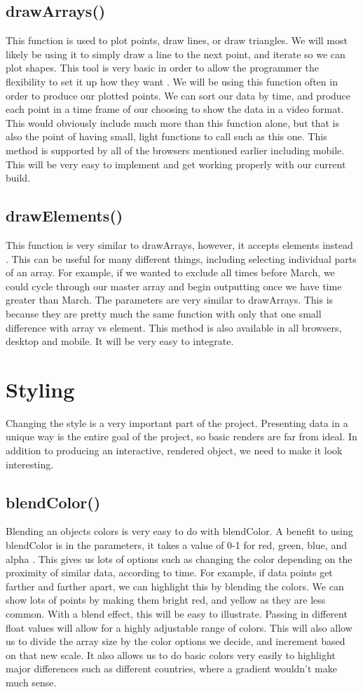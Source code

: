 \documentclass[letterpaper, 10pt] {article}
\begin{document}
\subsection{drawArrays()}
This function is used to plot points, draw lines, or draw triangles. We will most likely be using it to simply draw a line to the next point, and iterate so we can plot shapes. This tool is very basic in order to allow the programmer the flexibility to set it up how they want \cite{drawarrays}. 
We will be using this function often in order to produce our plotted points. We can sort our data by time, and produce each point in a time frame of our choosing to show the data in a video format. This would obviously include much more than this function alone, but that is also the point of having small, light functions to call such as this one.
This method is supported by all of the browsers mentioned earlier including mobile. This will be very easy to implement and get working properly with our current build.
\subsection{drawElements()}
This function is very similar to drawArrays, however, it accepts elements instead \cite{drawelements}. This can be useful for many different things, including selecting individual parts of an array. For example, if we wanted to exclude all times before March, we could cycle through our master array and begin outputting once we have time greater than March. 
The parameters are very similar to drawArrays. This is because they are pretty much the same function with only that one small difference with array vs element.
This method is also available in all browsers, desktop and mobile. It will be very easy to integrate.
\section{Styling}
Changing the style is a very important part of the project. Presenting data in a unique way is the entire goal of the project, so basic renders are far from ideal. In addition to producing an interactive, rendered object, we need to make it look interesting. 
\subsection{blendColor()}
Blending an objects colors is very easy to do with blendColor. A benefit to using blendColor is in the parameters, it takes a value of 0-1 for red, green, blue, and alpha \cite{blendcolor}. This gives us lots of options such as changing the color depending on the proximity of similar data, according to time. For example, if data points get farther and farther apart, we can highlight this by blending the colors. We can show lots of points by making them bright red, and yellow as they are less common. With a blend effect, this will be easy to illustrate. 
Passing in different float values will allow for a highly adjustable range of colors. This will also allow us to divide the array size by the color options we decide, and increment based on that new scale. It also allows us to do basic colors very easily to highlight major differences such as different countries, where a gradient wouldn’t make much sense. 
\end{document}
